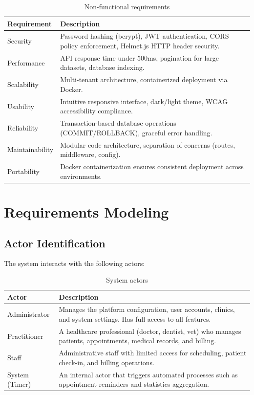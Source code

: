 \documentclass[12pt,a4paper,oneside]{report}
\begin{document}
\begin{table}[H]
\centering
\caption{Non-functional requirements}
\label{tab:nonfunctional_req}
\begin{tabular}{|p{3.5cm}|p{9.5cm}|}
\hline
\textbf{Requirement} & \textbf{Description} \\
\hline
Security & Password hashing (bcrypt), JWT authentication, CORS policy enforcement, Helmet.js HTTP header security. \\
\hline
Performance & API response time under 500ms, pagination for large datasets, database indexing. \\
\hline
Scalability & Multi-tenant architecture, containerized deployment via Docker. \\
\hline
Usability & Intuitive responsive interface, dark/light theme, WCAG accessibility compliance. \\
\hline
Reliability & Transaction-based database operations (COMMIT/ROLLBACK), graceful error handling. \\
\hline
Maintainability & Modular code architecture, separation of concerns (routes, middleware, config). \\
\hline
Portability & Docker containerization ensures consistent deployment across environments. \\
\hline
\end{tabular}
\end{table}

\section{Requirements Modeling}

\subsection{Actor Identification}
The system interacts with the following actors:

\begin{table}[H]
\centering
\caption{System actors}
\label{tab:actors}
\begin{tabular}{|p{3cm}|p{10cm}|}
\hline
\textbf{Actor} & \textbf{Description} \\
\hline
Administrator & Manages the platform configuration, user accounts, clinics, and system settings. Has full access to all features. \\
\hline
Practitioner & A healthcare professional (doctor, dentist, vet) who manages patients, appointments, medical records, and billing. \\
\hline
Staff & Administrative staff with limited access for scheduling, patient check-in, and billing operations. \\
\hline
System (Timer) & An internal actor that triggers automated processes such as appointment reminders and statistics aggregation. \\
\hline
\end{tabular}
\end{table}
\end{document}
